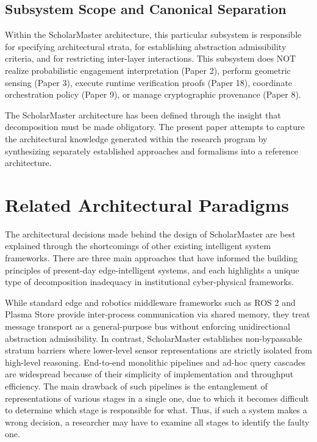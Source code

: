 \documentclass[conference]{IEEEtran}
\begin{document}
\subsection{Subsystem Scope and Canonical Separation}
Within the ScholarMaster architecture, this particular subsystem is responsible for specifying architectural strata, for establishing abstraction admissibility criteria, and for restricting inter-layer interactions. This subsystem does NOT realize probabilistic engagement interpretation (Paper 2), perform geometric sensing (Paper 3), execute runtime verification proofs (Paper 18), coordinate orchestration policy (Paper 9), or manage cryptographic provenance (Paper 8).

The ScholarMaster architecture has been defined through the insight that decomposition must be made obligatory. The present paper attempts to capture the architectural knowledge generated within the research program by synthesizing separately established approaches and formalisms into a reference architecture.

\section{Related Architectural Paradigms}
The architectural decisions made behind the design of ScholarMaster are best explained through the shortcomings of other existing intelligent system frameworks. There are three main approaches that have informed the building principles of present-day edge-intelligent systems, and each highlights a unique type of decomposition inadequacy in institutional cyber-physical frameworks.

While standard edge and robotics middleware frameworks such as ROS 2 \cite{b9} and Plasma Store \cite{b19} provide inter-process communication via shared memory, they treat message transport as a general-purpose bus without enforcing unidirectional abstraction admissibility. In contrast, ScholarMaster establishes non-bypassable stratum barriers where lower-level sensor representations are strictly isolated from high-level reasoning. End-to-end monolithic pipelines \cite{b7} and ad-hoc query cascades \cite{b23} are widespread because of their simplicity of implementation and throughput efficiency. The main drawback of such pipelines is the entanglement of representations of various stages in a single one, due to which it becomes difficult to determine which stage is responsible for what. Thus, if such a system makes a wrong decision, a researcher may have to examine all stages to identify the faulty one.
\end{document}
